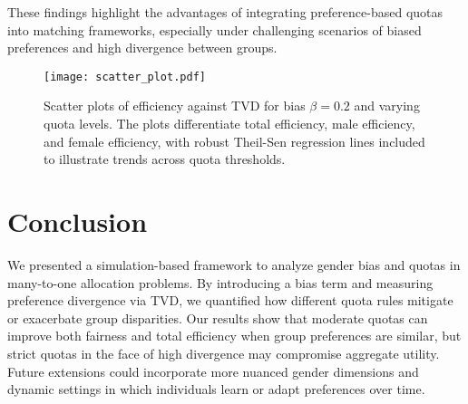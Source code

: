 \documentclass[letterpaper]{article}
\begin{document}
These findings highlight the advantages of integrating preference-based quotas into matching frameworks, especially under challenging scenarios of biased preferences and high divergence between groups.




\begin{figure}[ht]

  \centering
  \texttt{[image: scatter\_plot.pdf]}
\caption{Scatter plots of efficiency against TVD for bias \( \beta = 0.2 \) and varying quota levels. The plots differentiate total efficiency, male efficiency, and female efficiency, with robust Theil-Sen regression lines included to illustrate trends across quota thresholds.}

  \label{fig:scatter_plot}
\end{figure}







\section{Conclusion}
We presented a simulation-based framework to analyze gender bias and quotas in many-to-one allocation problems. By introducing a bias term and measuring preference divergence via TVD, we quantified how different quota rules mitigate or exacerbate group disparities. Our results show that moderate quotas can improve both fairness and total efficiency when group preferences are similar, but strict quotas in the face of high divergence may compromise aggregate utility. Future extensions could incorporate more nuanced gender dimensions and dynamic settings in which individuals learn or adapt preferences over time.

\bigskip


\end{document}
